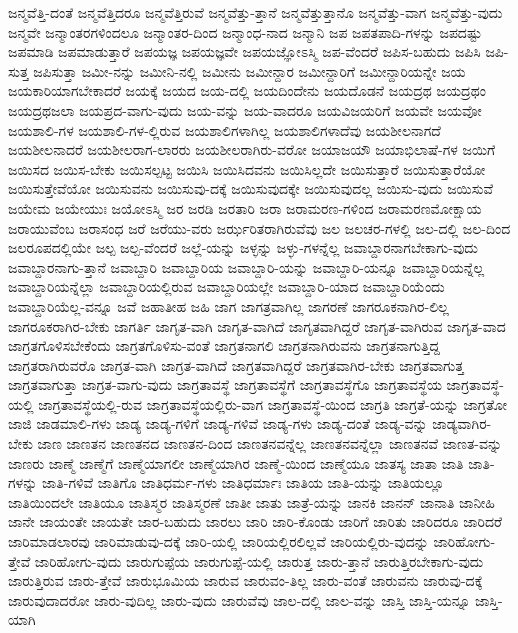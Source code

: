 {ಜನ್ಮವೆತ್ತಿ-ದಂತೆ
ಜನ್ಮವೆತ್ತಿದರೂ
ಜನ್ಮವೆತ್ತಿರುವೆ
ಜನ್ಮವೆತ್ತು-ತ್ತಾನೆ
ಜನ್ಮವೆತ್ತುತ್ತಾನೊ
ಜನ್ಮವೆತ್ತು-ವಾಗ
ಜನ್ಮವೆತ್ತು-ವುದು
ಜನ್ಮವೇ
ಜನ್ಮಾಂತರಗಳಿಂದಲೂ
ಜನ್ಮಾಂತರ-ದಿಂದ
ಜನ್ಮಾಂಧ-ನಾದ
ಜನ್ಮಾನಿ
ಜಪ
ಜಪತಪಾದಿ-ಗಳನ್ನು
ಜಪದಷ್ಟು
ಜಪಮಾಡಿ
ಜಪಮಾಡುತ್ತಾರೆ
ಜಪಯಜ್ಞ
ಜಪಯಜ್ಞವೇ
ಜಪಯಜ್ಞೋಽಸ್ಮಿ
ಜಪ-ವೆಂದರೆ
ಜಪಿಸ-ಬಹುದು
ಜಪಿಸಿ
ಜಪಿ-ಸುತ್ತ
ಜಪಿಸುತ್ತಾ
ಜಮೀ-ನನ್ನು
ಜಮೀನಿ-ನಲ್ಲಿ
ಜಮೀನು
ಜಮೀನ್ದಾರ
ಜಮೀನ್ದಾರಿಗೆ
ಜಮೀನ್ದಾರಿಯನ್ನೇ
ಜಯ
ಜಯಕಾರಿಯಾಗಬೇಕಾದರೆ
ಜಯಕ್ಕೆ
ಜಯದ
ಜಯ-ದಲ್ಲಿ
ಜಯದಿಂದೇನು
ಜಯದೊಡನೆ
ಜಯದ್ರಥ
ಜಯದ್ರಥಂ
ಜಯದ್ರಥಜಲಾ
ಜಯಪ್ರದ-ವಾಗು-ವುದು
ಜಯ-ವನ್ನು
ಜಯ-ವಾದರೂ
ಜಯವಿಜಯರಿಗೆ
ಜಯವೇ
ಜಯವೋ
ಜಯಶಾಲಿ-ಗಳ
ಜಯಶಾಲಿ-ಗಳ-ಲ್ಲಿರುವ
ಜಯಶಾಲಿಗಳಾಗಿಲ್ಲ
ಜಯಶಾಲಿಗಳಾದೆವು
ಜಯಶೀಲನಾಗದೆ
ಜಯಶೀಲನಾದರೆ
ಜಯಶೀಲರಾಗ-ಲಾರರು
ಜಯಶೀಲರಾಗಿರು-ವರೋ
ಜಯಾಜಯೌ
ಜಯಾಭಿಲಾಷೆ-ಗಳ
ಜಯಿಗೆ
ಜಯಿಸದ
ಜಯಿಸ-ಬೇಕು
ಜಯಿಸಲ್ಪಟ್ಟ
ಜಯಿಸಿ
ಜಯಿಸಿದವನು
ಜಯಿಸಿಲ್ಲದೇ
ಜಯಿಸುತ್ತಾರೆ
ಜಯಿಸುತ್ತಾರೆಯೋ
ಜಯಿಸುತ್ತೇವೆಯೋ
ಜಯಿಸುವನು
ಜಯಿಸುವು-ದಕ್ಕೆ
ಜಯಿಸುವುದಕ್ಕೇ
ಜಯಿಸುವುದಲ್ಲ
ಜಯಿಸು-ವುದು
ಜಯಿಸುವೆ
ಜಯೇಮ
ಜಯೇಯುಃ
ಜಯೋಽಸ್ಮಿ
ಜರ
ಜರಡಿ
ಜರತಾರಿ
ಜರಾ
ಜರಾಮರಣ-ಗಳಿಂದ
ಜರಾಮರಣಮೋಕ್ಷಾಯ
ಜರಾಯುವೆಂಬ
ಜರಾಸಂಧ
ಜರೆ
ಜರೆಯು-ವರು
ಜರ್ಝರಿತರಾಗಿರುವೆವು
ಜಲ
ಜಲಚರ-ಗಳಲ್ಲಿ
ಜಲ-ದಲ್ಲಿ
ಜಲ-ದಿಂದ
ಜಲರೂಪದಲ್ಲಿಯೇ
ಜಲ್ಪ
ಜಲ್ಪ-ವೆಂದರೆ
ಜಲ್ಲೆ-ಯನ್ನು
ಜಳ್ಳನ್ನು
ಜಳ್ಳು-ಗಳನ್ನೆಲ್ಲ
ಜವಾಬ್ದಾರನಾಗಬೇಕಾಗು-ವುದು
ಜವಾಬ್ದಾರನಾಗು-ತ್ತಾನೆ
ಜವಾಬ್ದಾರಿ
ಜವಾಬ್ದಾರಿಯ
ಜವಾಬ್ದಾರಿ-ಯನ್ನು
ಜವಾಬ್ದಾರಿ-ಯನ್ನೂ
ಜವಾಬ್ದಾರಿಯನ್ನೆಲ್ಲ
ಜವಾಬ್ದಾರಿಯನ್ನೆಲ್ಲಾ
ಜವಾಬ್ದಾರಿಯಲ್ಲಿರುವ
ಜವಾಬ್ದಾರಿಯಲ್ಲೇ
ಜವಾಬ್ದಾರಿ-ಯಾದ
ಜವಾಬ್ದಾರಿಯೆಂದು
ಜವಾಬ್ದಾರಿಯೆಲ್ಲ-ವನ್ನೂ
ಜವೆ
ಜಹಾತೀಹ
ಜಹಿ
ಜಾಗ
ಜಾಗತ್ರವಾಗಿಲ್ಲ
ಜಾಗರಣೆ
ಜಾಗರೂಕನಾಗಿರ-ಲಿಲ್ಲ
ಜಾಗರೂಕರಾಗಿರ-ಬೇಕು
ಜಾಗರ್ತಿ
ಜಾಗೃತ-ವಾಗಿ
ಜಾಗೃತ-ವಾಗಿದೆ
ಜಾಗೃತವಾಗಿದ್ದರೆ
ಜಾಗೃತ-ವಾಗಿರುವ
ಜಾಗೃತ-ವಾದ
ಜಾಗ್ರತಗೊಳಿಸಬೇಕೆಂದು
ಜಾಗ್ರತಗೊಳಿಸು-ವಂತೆ
ಜಾಗ್ರತನಾಗಲಿ
ಜಾಗ್ರತನಾಗಿರುವನು
ಜಾಗ್ರತನಾಗುತ್ತಿದ್ದ
ಜಾಗ್ರತರಾಗಿರುವರೊ
ಜಾಗ್ರತ-ವಾಗಿ
ಜಾಗ್ರತ-ವಾಗಿದೆ
ಜಾಗ್ರತವಾಗಿದ್ದರೆ
ಜಾಗ್ರತವಾಗಿರ-ಬೇಕು
ಜಾಗ್ರತವಾಗುತ್ತ
ಜಾಗ್ರತವಾಗುತ್ತಾ
ಜಾಗ್ರತ-ವಾಗು-ವುದು
ಜಾಗ್ರತಾವಸ್ಥೆ
ಜಾಗ್ರತಾವಸ್ಥೆಗೆ
ಜಾಗ್ರತಾವಸ್ಥೆಗೊ
ಜಾಗ್ರತಾವಸ್ಥೆಯ
ಜಾಗ್ರತಾವಸ್ಥೆ-ಯಲ್ಲಿ
ಜಾಗ್ರತಾವಸ್ಥೆಯಲ್ಲಿ-ರುವ
ಜಾಗ್ರತಾವಸ್ಥೆಯಲ್ಲಿರು-ವಾಗ
ಜಾಗ್ರತಾವಸ್ಥೆ-ಯಿಂದ
ಜಾಗ್ರತಿ
ಜಾಗ್ರತೆ-ಯನ್ನು
ಜಾಗ್ರತೋ
ಜಾಜಿ
ಜಾಡಮಾಲಿ-ಗಳು
ಜಾಡ್ಯ
ಜಾಡ್ಯ-ಗಳಿಗೆ
ಜಾಡ್ಯ-ಗಳಿವೆ
ಜಾಡ್ಯ-ಗಳು
ಜಾಡ್ಯ-ದಂತೆ
ಜಾಡ್ಯ-ವನ್ನು
ಜಾಡ್ಯವಾಗಿರ-ಬೇಕು
ಜಾಣ
ಜಾಣತನ
ಜಾಣತನದ
ಜಾಣತನ-ದಿಂದ
ಜಾಣತನವನ್ನೆಲ್ಲ
ಜಾಣತನವನ್ನೆಲ್ಲಾ
ಜಾಣತನವೆ
ಜಾಣತ-ವನ್ನು
ಜಾಣರು
ಜಾಣ್ಮೆ
ಜಾಣ್ಮೆಗೆ
ಜಾಣ್ಮೆಯಾಗಲೀ
ಜಾಣ್ಮೆಯಾಗಿರ
ಜಾಣ್ಮೆ-ಯಿಂದ
ಜಾಣ್ಮೆಯೂ
ಜಾತಸ್ಯ
ಜಾತಾ
ಜಾತಿ
ಜಾತಿ-ಗಳನ್ನು
ಜಾತಿ-ಗಳಿವೆ
ಜಾತಿಗೊ
ಜಾತಿಧರ್ಮ-ಗಳು
ಜಾತಿಧರ್ಮಾಃ
ಜಾತಿಯ
ಜಾತಿ-ಯನ್ನು
ಜಾತಿಯಲ್ಲೂ
ಜಾತಿಯಿಂದಲೇ
ಜಾತಿಯೂ
ಜಾತಿಸ್ಮರ
ಜಾತಿಸ್ಮರಣೆ
ಜಾತೀ
ಜಾತು
ಜಾತ್ರೆ-ಯನ್ನು
ಜಾನಕಿ
ಜಾನನ್
ಜಾನಾತಿ
ಜಾನೀಹಿ
ಜಾನೇ
ಜಾಯಂತೇ
ಜಾಯತೇ
ಜಾರ-ಬಹುದು
ಜಾರಲು
ಜಾರಿ
ಜಾರಿ-ಕೊಂಡು
ಜಾರಿಗೆ
ಜಾರಿತು
ಜಾರಿದರೂ
ಜಾರಿದರೆ
ಜಾರಿಮಾಡಲಾರವು
ಜಾರಿಮಾಡುವು-ದಕ್ಕೆ
ಜಾರಿ-ಯಲ್ಲಿ
ಜಾರಿಯಲ್ಲಿರಲಿಲ್ಲವೆ
ಜಾರಿಯಲ್ಲಿರು-ವುದನ್ನು
ಜಾರಿಹೋಗು-ತ್ತೇವೆ
ಜಾರಿಹೋಗು-ವುದು
ಜಾರುಗುಪ್ಪೆಯ
ಜಾರುಗುಪ್ಪೆ-ಯಲ್ಲಿ
ಜಾರುತ್ತ
ಜಾರು-ತ್ತಾನೆ
ಜಾರುತ್ತಿರಬೇಕಾಗು-ವುದು
ಜಾರುತ್ತಿರುವ
ಜಾರು-ತ್ತೇವೆ
ಜಾರುಭೂಮಿಯ
ಜಾರುವ
ಜಾರುವಂ-ತಿಲ್ಲ
ಜಾರು-ವಂತೆ
ಜಾರುವನು
ಜಾರುವು-ದಕ್ಕೆ
ಜಾರುವುದಾದರೋ
ಜಾರು-ವುದಿಲ್ಲ
ಜಾರು-ವುದು
ಜಾರುವೆವು
ಜಾಲ-ದಲ್ಲಿ
ಜಾಲ-ವನ್ನು
ಜಾಸ್ತಿ
ಜಾಸ್ತಿ-ಯನ್ನೂ
ಜಾಸ್ತಿ-ಯಾಗಿ
}
